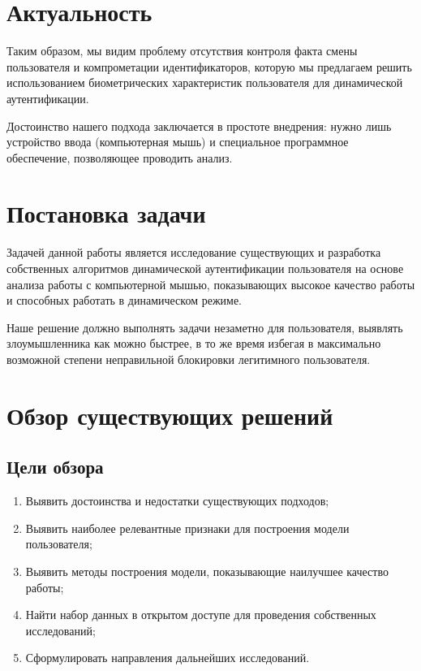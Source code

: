\documentclass[12pt]{article}
\begin{document}
    \newpage



    \section{Актуальность}
    \label{sec:Relevance}

    \par Таким образом, мы видим проблему отсутствия контроля факта смены пользователя и компрометации идентификаторов, которую мы предлагаем решить использованием биометрических характеристик пользователя для динамической аутентификации. \\
    \par Достоинство нашего подхода заключается в простоте внедрения: нужно лишь устройство ввода (компьютерная мышь) и специальное программное обеспечение, позволяющее проводить анализ.

    \newpage



    \section{Постановка задачи}
    \label{sec:FormulationOfProblem}
    
    \par Задачей данной работы является исследование существующих и разработка собственных алгоритмов динамической аутентификации пользователя на основе анализа работы с компьютерной мышью, показывающих высокое качество работы и способных работать в динамическом режиме. \\
    \par Наше решение должно выполнять задачи незаметно для пользователя, выявлять злоумышленника как можно быстрее, в то же время избегая в максимально возможной степени неправильной блокировки легитимного пользователя.

    \newpage



    \section{Обзор существующих решений}
    \label{sec:Overview}

    \subsection{Цели обзора}
    \label{sec:Overview:Goals}

    \begin{enumerate}
        \item Выявить достоинства и недостатки существующих подходов;
        \item Выявить наиболее релевантные признаки для построения модели пользователя;
        \item Выявить методы построения модели, показывающие наилучшее качество работы;
        \item Найти набор данных в открытом доступе для проведения собственных исследований;
        \item Сформулировать направления дальнейших исследований.
    \end{enumerate}
\end{document}
